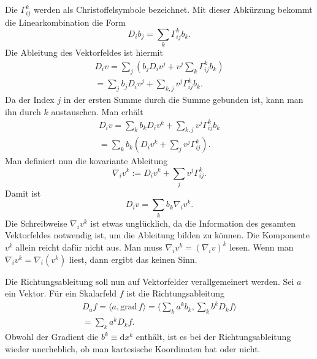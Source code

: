 \documentclass[a4paper,10pt,fleqn,twocolumn,twoside]{article}
\begin{document}
Die $\Gamma_{ij}^k$ werden als Christoffelsymbole bezeichnet.
Mit dieser Abkürzung bekommt die Linearkombination die Form
\begin{equation}
D_ib_j = \sum_{k} \Gamma_{ij}^k b_k.
\end{equation}
Die Ableitung des Vektorfeldes ist hiermit
\begin{gather}
D_i v  = \sum_{j}(b_jD_i v^j+v^j\sum_{k} \Gamma_{ij}^k b_k)\\
= \sum_{j}b_jD_i v^j+\sum_{k,j}v^j \Gamma_{ij}^k b_k.
\end{gather}
Da der Index $j$ in der ersten Summe durch die Summe gebunden ist,
kann man ihn durch $k$ austauschen. Man erhält
\begin{gather}
D_i v = \sum_{k}b_kD_i v^k+\sum_{k,j}v^j \Gamma_{ij}^k b_k\\
= \sum_{k}b_k(D_i v^k+\sum_{j}v^j\Gamma_{ij}^k).
\end{gather}
Man definiert nun die kovariante Ableitung
\begin{equation}
\nabla_i v^k := D_i v^k+\sum_{j}v^j\Gamma_{ij}^k.
\end{equation}
Damit ist
\begin{equation}
D_i v = \sum_{k}b_k\nabla_i v^k.
\end{equation}
Die Schreibweise $\nabla_i v^k$ ist etwas unglücklich, da die
Information des gesamten Vektorfeldes notwendig ist, um die Ableitung
bilden zu können. Die Komponente $v^k$ allein reicht dafür nicht
aus. Man muss $\nabla_i v^k=(\nabla_i v)^k$ lesen. Wenn man
$\nabla_i v^k=\nabla_i(v^k)$ liest, dann ergibt das keinen Sinn.

Die Richtungsableitung soll nun auf Vektorfelder verallgemeinert
werden. Sei $a$ ein Vektor. Für ein Skalarfeld $f$ ist die
Richtungsableitung
\begin{gather*}
{D_a}f = \langle a,\mathrm{grad}\,f\rangle
= \langle \sum_k a^kb_k,\sum_k b^k D_k f\rangle\\
= \sum_k a^k D_k f.
\end{gather*}
Obwohl der Gradient die $b^k\equiv\mathrm dx^k$ enthält, ist es bei
der Richtungsableitung wieder unerheblich, ob man kartesische
Koordinaten hat oder nicht.
\end{document}
